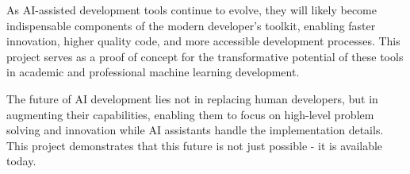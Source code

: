 \documentclass[12pt,letterpaper]{article}
\begin{document}
As AI-assisted development tools continue to evolve, they will likely become indispensable components of the modern developer's toolkit, enabling faster innovation, higher quality code, and more accessible development processes. This project serves as a proof of concept for the transformative potential of these tools in academic and professional machine learning development.

The future of AI development lies not in replacing human developers, but in augmenting their capabilities, enabling them to focus on high-level problem solving and innovation while AI assistants handle the implementation details. This project demonstrates that this future is not just possible - it is available today.
\end{document}
